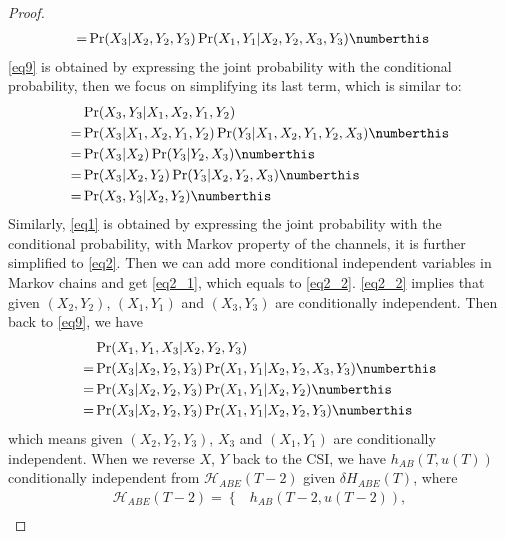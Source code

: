 \begin{proof}
\begin{subequations}
\begin{align*}
        =&\Pr(X_3|X_2,Y_2,Y_3) \Pr(X_1,Y_1|X_2,Y_2,X_3,Y_3) \numberthis \label{eq9}
    \end{align*}
\end{subequations}
\eqref{eq9} is obtained by expressing the joint probability with the conditional probability, then we focus on simplifying its last term, which is similar to:
\begin{subequations}
    \begin{align*}
        &\Pr(X_3,Y_3|X_1,X_2,Y_1,Y_2)\\
        =&\Pr(X_3|X_1,X_2,Y_1,Y_2)\Pr(Y_3|X_1,X_2,Y_1,Y_2,X_3) \numberthis \label{eq1}\\
        =&\Pr(X_3|X_2)\Pr(Y_3|Y_2,X_3) \numberthis \label{eq2}\\
        =&\Pr(X_3|X_2,Y_2)\Pr(Y_3|X_2,Y_2,X_3) \numberthis \label{eq2_1}\\
        =&\Pr(X_3,Y_3|X_2,Y_2) \numberthis \label{eq2_2}\\
    \end{align*}
\end{subequations}
Similarly, \eqref{eq1} is obtained by expressing the joint probability with the conditional probability, 
with Markov property of the channels,
it is further simplified to \eqref{eq2}. Then we can add more conditional independent variables in Markov chains and get \eqref{eq2_1}, which equals to \eqref{eq2_2}. \eqref{eq2_2} implies that given $(X_2,Y_2)$, $(X_1,Y_1)$ and $(X_3,Y_3)$ are conditionally independent. Then back to \eqref{eq9}, we have 
\begin{subequations}
    \begin{align*}
        &\Pr(X_1,Y_1,X_3|X_2,Y_2,Y_3)\\
        =&\Pr(X_3|X_2,Y_2,Y_3) \Pr(X_1,Y_1|X_2,Y_2,X_3,Y_3) \numberthis \label{eq9_1}\\
        =&\Pr(X_3|X_2,Y_2,Y_3)\Pr(X_1,Y_1|X_2,Y_2) \numberthis \label{eq10}\\
        =&\Pr(X_3|X_2,Y_2,Y_3)\Pr(X_1,Y_1|X_2,Y_2,Y_3) \numberthis \label{eq11}
    \end{align*}
\end{subequations}
which means given $(X_2,Y_2,Y_3)$, $X_3$ and $(X_1,Y_1)$ are conditionally independent.
When we reverse $X$, $Y$ back to the CSI, we have $h_{AB}\left(T,u(T)\right)$ conditionally independent from $\mathcal{H}_{ABE}(T-2)$ given $\delta H_{ABE}(T)$, where 
\begin{align*}
\mathcal{H}_{ABE}(T-2) = \left\{ \right. & \left. h_{AB}\left(T-2, u(T-2)\right), \right. \\

\end{align*}
\end{proof}
